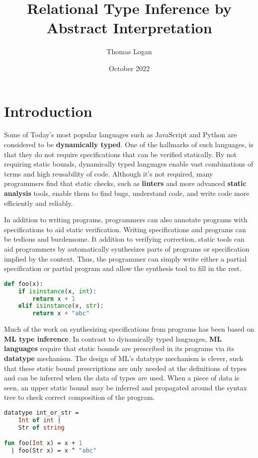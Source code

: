 \documentclass[manuscript]{acmart}
\title{Relational Type Inference by Abstract Interpretation}
\author{Thomas Logan}
\date{October 2022}
\theoremstyle{definition}
\begin{document}
\maketitle

\section{Introduction}
Some of Today's most popular languages such as JavaScript and Python are considered to be \textbf{dynamically typed}.
One of the hallmarks of such languages, is that they do not require specifications 
that can be verified statically. By not requiring static bounds, dynamically typed languages
enable vast combinations of terms and high reusability of code. 
Although it's not required, many programmers find that
static checks, such as \textbf{linters} and more advanced \textbf{static analysis} tools, 
enable them to find bugs, understand code, and write code more efficiently and reliably. 

In addition to writing programs, programmers can also annotate programs with specifications to
aid static verification. Writing specifications and programs can be tedious and burdensome.  
It addition to verifying correction, static tools can aid programmers by automatically synthesizes
parts of programs or specification implied by the context. Thus, the programmer can simply write
either a partial specification or partial program and allow the synthesis tool to fill in the rest.   

\begin{lstlisting}[language=Python]
def foo(x):
    if isinstance(x, int):
        return x + 1 
    elif isinstance(x, str): 
        return x + "abc"
\end{lstlisting}

Much of the work on synthesizing specifications from programs has been based on \textbf{ML type inference}.
In contrast to dynamically typed languages, \textbf{ML languages} require that static bounds are prescribed 
in its programs via its \textbf{datatype} mechanism. The design of ML's datatype mechanism is clever, 
such that these static bound prescriptions are only needed at the definitions of types and can be 
inferred when the data of types are used. When a piece of data is seen, an upper static bound 
may be inferred and propagated around the syntax tree to check correct composition of the program.

\begin{lstlisting}[language=ML]
datatype int_or_str = 
    Int of int | 
    Str of string

fun foo(Int x) = x + 1
  | foo(Str x) = x ^ "abc"
\end{lstlisting}
\end{document}
